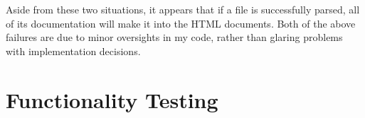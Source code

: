 Aside from these two situations, it appears that if a file is successfully
parsed, all of its documentation will make it into the HTML documents. Both of
the above failures are due to minor oversights in my code, rather than glaring
problems with implementation decisions.

\section{Functionality Testing}
